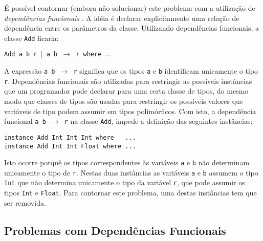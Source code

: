 \'E poss\'ivel contornar (embora n\~ao solucionar) este problema com a utiliza\c{c}\~ao de 
\emph{depend\^encias funcionais} \cite{Jones00}. A id\'eia \'e declarar explicitamente uma rela\c{c}\~ao 
de depend\^encia entre os par\^ametros da classe. Utilizando depend\^encias funcionais, a classe \texttt{Add} ficaria:
\begin{center}
   \texttt{Add a b r $|$ a b $\rightarrow$ r where $\ldots$}
\end{center}

A express\~ao \texttt{a b $\rightarrow$ r} significa que os tipos \texttt{a} e \texttt{b} identificam
unicamente o tipo \texttt{r}. Depend\^encias funcionais s\~ao utilizadas 
para restringir as poss\'iveis inst\^ancias que um programador pode declarar para 
uma certa classe de tipos, do mesmo modo que classes de tipos s\~ao usadas para restringir 
os poss\'iveis valores que vari\'aveis de tipo podem assumir em tipos polim\'orficos. Com isto, a depend\^encia
funcional \texttt{a b $\rightarrow$ r} na classe \texttt{Add}, impede a defini\c{c}\~ao das seguintes inst\^ancias:
\begin{center}
   \verb|instance Add Int Int Int where   ...|\\
   \verb|instance Add Int Int Float where ...|\\
\end{center}

Isto ocorre porqu\^e os tipos correspondentes \`as vari\'aveis \texttt{a} e \texttt{b} n\~ao 
determinam unicamente o tipo de \texttt{r}. Nestas duas inst\^ancias as vari\'aveis \texttt{a} 
e \texttt{b}  assumem o tipo \texttt{Int} que n\~ao determina unicamente o tipo da vari\'avel 
\texttt{r}, que pode assumir os tipos \texttt{Int} e \texttt{Float}. Para contornar este 
problema, uma destas inst\^ancias tem que ser removida.

\subsection{Problemas com Depend\^encias Funcionais}\label{fundepsproblems}

